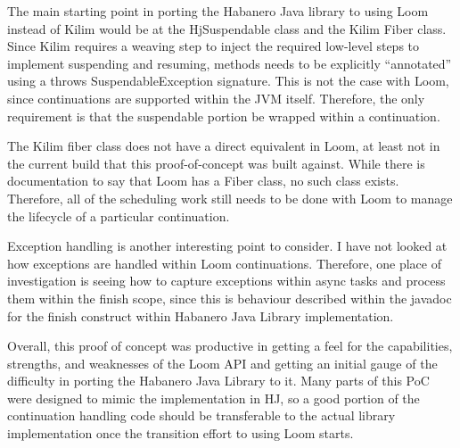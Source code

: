 \documentclass[12pt]{article}
\begin{document}
    The main starting point in porting the Habanero Java library to using Loom instead of Kilim would be at
    the HjSuspendable class and the Kilim Fiber class. Since Kilim requires a weaving step to inject the
    required low-level steps to implement suspending and resuming, methods needs to be explicitly
    ``annotated'' using a throws SuspendableException signature. This is not the case with Loom, since
    continuations are supported within the JVM itself. Therefore, the only requirement is that the
    suspendable portion be wrapped within a continuation.

    The Kilim fiber class does not have a direct equivalent in Loom, at least not in the current build that
    this proof-of-concept was built against. While there is documentation to say that Loom has a Fiber class,
    no such class exists. Therefore, all of the scheduling work still needs to be done with Loom to manage
    the lifecycle of a particular continuation.

    Exception handling is another interesting point to consider. I have not looked at how exceptions are
    handled within Loom continuations. Therefore, one place of investigation is seeing how to capture
    exceptions within async tasks and process them within the finish scope, since this is behaviour described
    within the javadoc for the finish construct within Habanero Java Library implementation. 

    Overall, this proof of concept was productive in getting a feel for the capabilities, strengths, and
    weaknesses of the Loom API and getting an initial gauge of the difficulty in porting the Habanero Java
    Library to it. Many parts of this PoC were designed to mimic the implementation in HJ, so a good portion
    of the continuation handling code should be transferable to the actual library implementation once the
    transition effort to using Loom starts.
\end{document}
